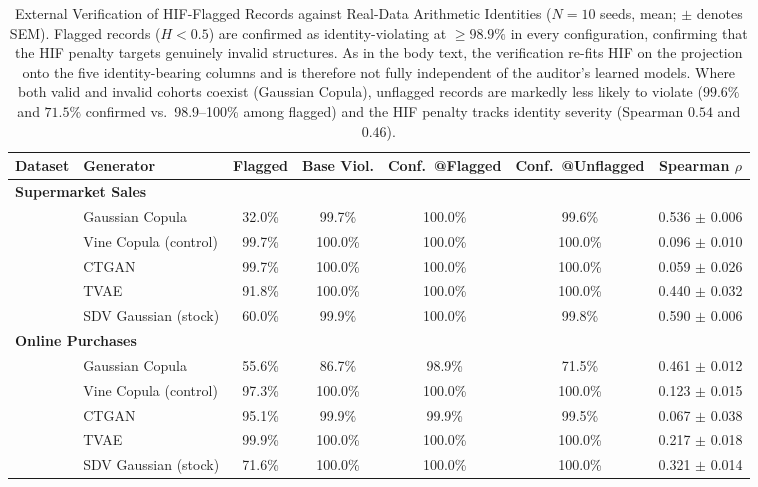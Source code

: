 \documentclass[pdflatex,sn-mathphys-num]{sn-jnl}
\theoremstyle{thmstyleone}%
\theoremstyle{thmstyletwo}%
\theoremstyle{thmstylethree}%
\begin{document}
\begin{table}[htbp]
\centering
\caption{External Verification of HIF-Flagged Records against Real-Data Arithmetic Identities ($N=10$ seeds, mean; $\pm$ denotes SEM). Flagged records ($H < 0.5$) are confirmed as identity-violating at $\ge 98.9\%$ in every configuration, confirming that the HIF penalty targets genuinely invalid structures. As in the body text, the verification re-fits HIF on the projection onto the five identity-bearing columns and is therefore not fully independent of the auditor's learned models. Where both valid and invalid cohorts coexist (Gaussian Copula), unflagged records are markedly less likely to violate ($\mathbf{99.6\%}$ and $\mathbf{71.5\%}$ confirmed vs.\ 98.9--100\% among flagged) and the HIF penalty tracks identity severity (Spearman $\mathbf{0.54}$ and $\mathbf{0.46}$).}
\label{tab:identity_verification}
\footnotesize
\setlength{\tabcolsep}{2.5pt}
\begin{tabular}{@{}llccccc@{}}
\toprule
Dataset & Generator & Flagged & Base Viol. & Conf.\ @Flagged & Conf.\ @Unflagged & Spearman $\rho$ \\
\midrule
\multicolumn{7}{l}{\textbf{Supermarket Sales}} \\
\quad & Gaussian Copula & 32.0\% & 99.7\% & 100.0\% & 99.6\% & 0.536 $\pm$ 0.006 \\
\quad & Vine Copula (control) &99.7\% & 100.0\% & 100.0\% & 100.0\% & 0.096 $\pm$ 0.010 \\
\quad & CTGAN & 99.7\% & 100.0\% & 100.0\% & 100.0\% & 0.059 $\pm$ 0.026 \\
\quad & TVAE & 91.8\% & 100.0\% & 100.0\% & 100.0\% & 0.440 $\pm$ 0.032 \\
\quad & SDV Gaussian (stock) & 60.0\% & 99.9\% & 100.0\% & 99.8\% & 0.590 $\pm$ 0.006 \\
\midrule
\multicolumn{7}{l}{\textbf{Online Purchases}} \\
\quad & Gaussian Copula & 55.6\% & 86.7\% & 98.9\% & 71.5\% & 0.461 $\pm$ 0.012 \\
\quad & Vine Copula (control) &97.3\% & 100.0\% & 100.0\% & 100.0\% & 0.123 $\pm$ 0.015 \\
\quad & CTGAN & 95.1\% & 99.9\% & 99.9\% & 99.5\% & 0.067 $\pm$ 0.038 \\
\quad & TVAE & 99.9\% & 100.0\% & 100.0\% & 100.0\% & 0.217 $\pm$ 0.018 \\
\quad & SDV Gaussian (stock) & 71.6\% & 100.0\% & 100.0\% & 100.0\% & 0.321 $\pm$ 0.014 \\
\bottomrule
\end{tabular}
\end{table}
\end{document}
